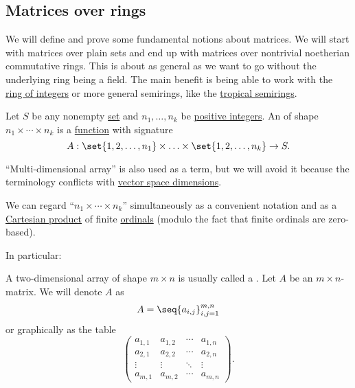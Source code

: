 \subsection{Matrices over rings}\label{subsec:matrices_over_rings}

We will define and prove some fundamental notions about matrices. We will start with matrices over plain sets and end up with matrices over nontrivial noetherian commutative rings. This is about as general as we want to go without the underlying ring being a field. The main benefit is being able to work with the \hyperref[def:integers]{ring of integers} or more general semirings, like the \hyperref[def:tropical_semiring]{tropical semirings}.

\begin{definition}\label{def:array}\mimprovised
  Let \( S \) be any nonempty \hyperref[def:set]{set} and \( n_1, \ldots, n_k \) be \hyperref[def:integer_signum]{positive integers}. An  of shape \( n_1 \times \cdots \times n_k \) is a \hyperref[def:function]{function} with signature
  \begin{equation*}
    A: \set{ 1, 2, \ldots, n_1 } \times \ldots \times \set{ 1, 2, \ldots, n_k } \to S.
  \end{equation*}

  \enquote{Multi-dimensional array} is also used as a term, but we will avoid it because the terminology conflicts with \hyperref[thm:vector_space_dimension]{vector space dimensions}.

  We can regard \enquote{\( n_1 \times \cdots \times n_k \)} simultaneously as a convenient notation and as a \hyperref[def:cartesian_product]{Cartesian product} of finite \hyperref[def:ordinal]{ordinals} (modulo the fact that finite ordinals are zero-based).

  In particular:
  \begin{thmenum}
     A two-dimensional array of shape \( m \times n \) is usually called a . Let \( A \) be an \( m \times n \)-matrix. We will denote \( A \) as
    \begin{equation*}
      A = \seq{ a_{i,j} }_{i,j=1}^{m,n}
    \end{equation*}
    or graphically as the table
    \begin{equation*}
      \begin{pmatrix}
        a_{1,1} & a_{1,2} & \cdots & a_{1,n} \\
        a_{2,1} & a_{2,2} & \cdots & a_{2,n} \\
        \vdots  & \vdots  & \ddots & \vdots  \\
        a_{m,1} & a_{m,2} & \cdots & a_{m,n}
      \end{pmatrix}.
    \end{equation*}


\end{thmenum}
\end{definition}
